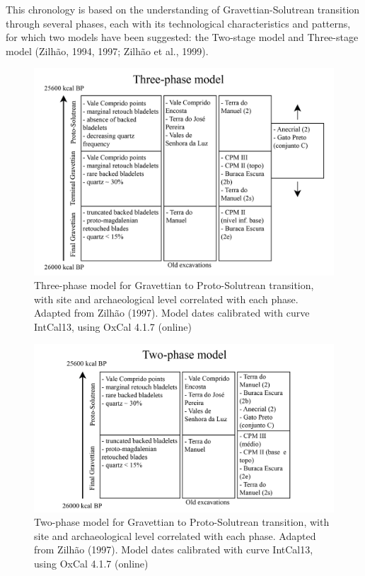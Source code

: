 \documentclass[12pt,twoside]{reedthesis}
\begin{document}
This chronology is based on the understanding of Gravettian-Solutrean transition through several phases, each with its technological characteristics and patterns, for which two models have been suggested: the Two-stage model and Three-stage model (Zilhão, 1994, 1997; Zilhão et al., 1999).
\begin{figure}
\includegraphics[width=1\linewidth]{figure/Three-phasemodel} \caption{Three-phase model for Gravettian to Proto-Solutrean transition, with site and archaeological level correlated with each phase. Adapted from Zilhão (1997). Model dates calibrated with curve IntCal13, using OxCal 4.1.7 (online)}\label{fig:unnamed-chunk-3}
\end{figure}
\begin{figure}
\includegraphics[width=1\linewidth]{figure/Two-phasemodel} \caption{Two-phase model for Gravettian to Proto-Solutrean transition, with site and archaeological level correlated with each phase. Adapted from Zilhão (1997). Model dates calibrated with curve IntCal13, using OxCal 4.1.7 (online)}\label{fig:unnamed-chunk-4}
\end{figure}
\end{document}
